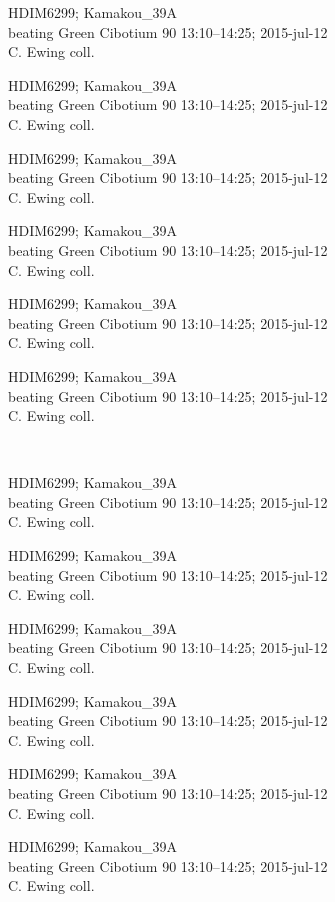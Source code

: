 \documentclass[2pt]{extarticle}
\begin{document}
\noindent
\parbox{0.16\textwidth}{\tiny \raggedright \rule[-0.3\baselineskip]{0pt}{10pt}HDIM6299; Kamakou\_39A\\ beating Green Cibotium 90 13:10--14:25; 2015-jul-12\\ C. Ewing coll.}
\parbox{0.16\textwidth}{\tiny \raggedright \rule[-0.3\baselineskip]{0pt}{10pt}HDIM6299; Kamakou\_39A\\ beating Green Cibotium 90 13:10--14:25; 2015-jul-12\\ C. Ewing coll.}
\parbox{0.16\textwidth}{\tiny \raggedright \rule[-0.3\baselineskip]{0pt}{10pt}HDIM6299; Kamakou\_39A\\ beating Green Cibotium 90 13:10--14:25; 2015-jul-12\\ C. Ewing coll.}
\parbox{0.16\textwidth}{\tiny \raggedright \rule[-0.3\baselineskip]{0pt}{10pt}HDIM6299; Kamakou\_39A\\ beating Green Cibotium 90 13:10--14:25; 2015-jul-12\\ C. Ewing coll.}
\parbox{0.16\textwidth}{\tiny \raggedright \rule[-0.3\baselineskip]{0pt}{10pt}HDIM6299; Kamakou\_39A\\ beating Green Cibotium 90 13:10--14:25; 2015-jul-12\\ C. Ewing coll.}
\parbox{0.16\textwidth}{\tiny \raggedright \rule[-0.3\baselineskip]{0pt}{10pt}HDIM6299; Kamakou\_39A\\ beating Green Cibotium 90 13:10--14:25; 2015-jul-12\\ C. Ewing coll.} \\ 
\vspace{0.001in} 

\noindent
\parbox{0.16\textwidth}{\tiny \raggedright \rule[-0.3\baselineskip]{0pt}{10pt}HDIM6299; Kamakou\_39A\\ beating Green Cibotium 90 13:10--14:25; 2015-jul-12\\ C. Ewing coll.}
\parbox{0.16\textwidth}{\tiny \raggedright \rule[-0.3\baselineskip]{0pt}{10pt}HDIM6299; Kamakou\_39A\\ beating Green Cibotium 90 13:10--14:25; 2015-jul-12\\ C. Ewing coll.}
\parbox{0.16\textwidth}{\tiny \raggedright \rule[-0.3\baselineskip]{0pt}{10pt}HDIM6299; Kamakou\_39A\\ beating Green Cibotium 90 13:10--14:25; 2015-jul-12\\ C. Ewing coll.}
\parbox{0.16\textwidth}{\tiny \raggedright \rule[-0.3\baselineskip]{0pt}{10pt}HDIM6299; Kamakou\_39A\\ beating Green Cibotium 90 13:10--14:25; 2015-jul-12\\ C. Ewing coll.}
\parbox{0.16\textwidth}{\tiny \raggedright \rule[-0.3\baselineskip]{0pt}{10pt}HDIM6299; Kamakou\_39A\\ beating Green Cibotium 90 13:10--14:25; 2015-jul-12\\ C. Ewing coll.}
\parbox{0.16\textwidth}{\tiny \raggedright \rule[-0.3\baselineskip]{0pt}{10pt}HDIM6299; Kamakou\_39A\\ beating Green Cibotium 90 13:10--14:25; 2015-jul-12\\ C. Ewing coll.} \\ 
\vspace{0.001in} 
\end{document}
